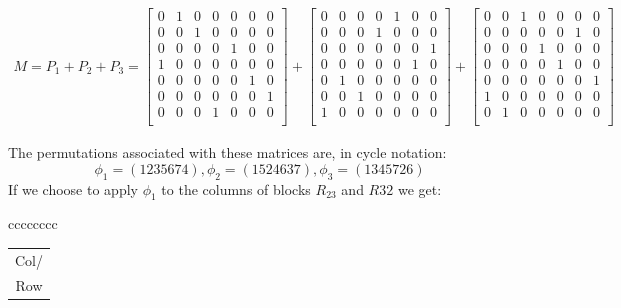 \documentclass[
  12pt,
  a4paper]{book}
\begin{document}
\[\begin{gathered}
M= P_1 + P_2 + P_3 = 
  \begin{bmatrix}
  0 & 1 & 0 & 0 & 0 & 0 & 0\\
  0 & 0 & 1 & 0 & 0 & 0 & 0\\
  0 & 0 & 0 & 0 & 1 & 0 & 0\\
  1 & 0 & 0 & 0 & 0 & 0 & 0\\
  0 & 0 & 0 & 0 & 0 & 1 & 0\\
  0 & 0 & 0 & 0 & 0 & 0 & 1\\
  0 & 0 & 0 & 1 & 0 & 0 & 0\\
  \end{bmatrix}
  +
  \begin{bmatrix}
  0 & 0 & 0 & 0 & 1 & 0 & 0\\
  0 & 0 & 0 & 1 & 0 & 0 & 0\\
  0 & 0 & 0 & 0 & 0 & 0 & 1\\
  0 & 0 & 0 & 0 & 0 & 1 & 0\\
  0 & 1 & 0 & 0 & 0 & 0 & 0\\
  0 & 0 & 1 & 0 & 0 & 0 & 0\\
  1 & 0 & 0 & 0 & 0 & 0 & 0\\
  \end{bmatrix}
  +
  \begin{bmatrix}
  0 & 0 & 1 & 0 & 0 & 0 & 0\\
  0 & 0 & 0 & 0 & 0 & 1 & 0\\
  0 & 0 & 0 & 1 & 0 & 0 & 0\\
  0 & 0 & 0 & 0 & 1 & 0 & 0\\
  0 & 0 & 0 & 0 & 0 & 0 & 1\\
  1 & 0 & 0 & 0 & 0 & 0 & 0\\
  0 & 1 & 0 & 0 & 0 & 0 & 0\\
  \end{bmatrix}\end{gathered}\]

The permutations associated with these matrices are, in cycle notation:
\[\phi _1 = (1235674), \phi _2 = (1524637), \phi _3 = (1345726)\] If we
choose to apply \(\phi _1\) to the columns of blocks \(R_{23}\) and
\(R{32}\) we get:

{\textbar c\textbar c\textbar c\textbar c\textbar c\textbar c\textbar c\textbar c\textbar{}}

\begin{longtable}[]{@{}c@{}}
\toprule
\endhead
Col/\tabularnewline
Row\tabularnewline
\bottomrule
\end{longtable}
\end{document}
